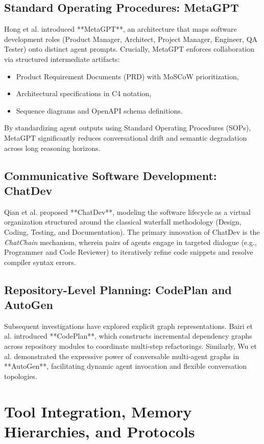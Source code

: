 \subsection{Standard Operating Procedures: MetaGPT}
Hong et al. \cite{Hong2024MetaGPT} introduced **MetaGPT**, an architecture that maps software development roles (Product Manager, Architect, Project Manager, Engineer, QA Tester) onto distinct agent prompts. Crucially, MetaGPT enforces collaboration via structured intermediate artifacts:
\begin{itemize}
    \item Product Requirement Documents (PRD) with MoSCoW prioritization,
    \item Architectural specifications in C4 notation,
    \item Sequence diagrams and OpenAPI schema definitions.
\end{itemize}
By standardizing agent outputs using Standard Operating Procedures (SOPs), MetaGPT significantly reduces conversational drift and semantic degradation across long reasoning horizons.

\subsection{Communicative Software Development: ChatDev}
Qian et al. \cite{Qian2024ChatDev} proposed **ChatDev**, modeling the software lifecycle as a virtual organization structured around the classical waterfall methodology (Design, Coding, Testing, and Documentation). The primary innovation of ChatDev is the \emph{ChatChain} mechanism, wherein pairs of agents engage in targeted dialogue (e.g., Programmer and Code Reviewer) to iteratively refine code snippets and resolve compiler syntax errors.

\subsection{Repository-Level Planning: CodePlan and AutoGen}
Subsequent investigations have explored explicit graph representations. Bairi et al. \cite{Bairi2024CodePlan} introduced **CodePlan**, which constructs incremental dependency graphs across repository modules to coordinate multi-step refactorings. Similarly, Wu et al. \cite{Wu2023AutoGen} demonstrated the expressive power of conversable multi-agent graphs in **AutoGen**, facilitating dynamic agent invocation and flexible conversation topologies.

\section{Tool Integration, Memory Hierarchies, and Protocols}
\label{sec:tools_and_memory}

